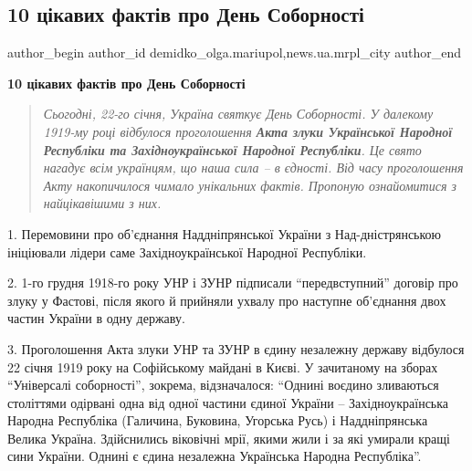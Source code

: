  
 
 
 
 
 
\subsection{10 цікавих фактів про День Соборності}
\label{sec:22_01_2020.stz.news.ua.mrpl_city.1.10_faktiv_den_sobornosti}
 
\ifcmt
 author_begin
   author_id demidko_olga.mariupol,news.ua.mrpl_city
 author_end
\fi

\begin{center}
\textbf{10 цікавих фактів про День Соборності}
\end{center}

\begin{quote}
\em Сьогодні, 22-го січня, Україна святкує День Соборності. У далекому 1919-му році
відбулося проголошення \textbf{Акта злуки Української Народної Республіки та
Західноукраїнської Народної Республіки}. Це свято нагадує всім українцям, що
наша сила – в єдності. Від часу проголошення Акту накопичилося чимало
унікальних фактів. Пропоную ознайомитися з найцікавішими з них. 
\end{quote}

1. Перемовини про об'єднання Наддніпрянської України з Над\hyp{}дністрянською
ініціювали лідери саме Західноукраїнської Народної Республіки.

2. 1-го грудня 1918-го року УНР і ЗУНР підписали \enquote{передвступний} договір про
злуку у Фастові, після якого й прийняли ухвалу про наступне об'єднання двох
частин України в одну державу.

3. Проголошення Акта злуки УНР та ЗУНР в єдину незалежну державу відбулося 22
січня 1919 року на Софійському майдані в Києві. У зачитаному на зборах
\enquote{Універсалі соборності}, зокрема, відзначалося: \enquote{Однині воєдино зливаються
століттями одірвані одна від одної частини єдиної України – Західноукраїнська
Народна Республіка (Галичина, Буковина, Угорська Русь) і Наддніпрянська Велика
Україна. Здійснились віковічні мрії, якими жили і за які умирали кращі сини
України. Однині є єдина незалежна Українська Народна Республіка}.

